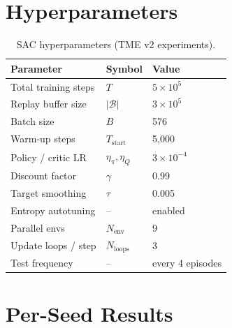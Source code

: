 \documentclass{article}
\begin{document}
\section{Hyperparameters}
\label{app:hyperparams}

\begin{table}[h]
  \centering\small
  \caption{SAC hyperparameters (TME v2 experiments).}
  \label{tab:hyperparams}
  \begin{tabular}{lll}
    \toprule
    \textbf{Parameter} & \textbf{Symbol} & \textbf{Value} \\
    \midrule
    Total training steps & $T$              & $5\!\times\!10^5$ \\
    Replay buffer size   & $|\mathcal{B}|$  & $3\!\times\!10^5$ \\
    Batch size           & $B$              & 576 \\
    Warm-up steps        & $T_\text{start}$ & 5{,}000 \\
    Policy / critic LR   & $\eta_\pi,\eta_Q$& $3\!\times\!10^{-4}$ \\
    Discount factor      & $\gamma$         & 0.99 \\
    Target smoothing     & $\tau$           & 0.005 \\
    Entropy autotuning   & --               & enabled \\
    Parallel envs        & $N_\text{env}$   & 9 \\
    Update loops / step  & $N_\text{loops}$ & 3 \\
    Test frequency       & --               & every 4 episodes \\
    \bottomrule
  \end{tabular}
\end{table}

\section{Per-Seed Results}
\label{app:per_seed}
\end{document}
